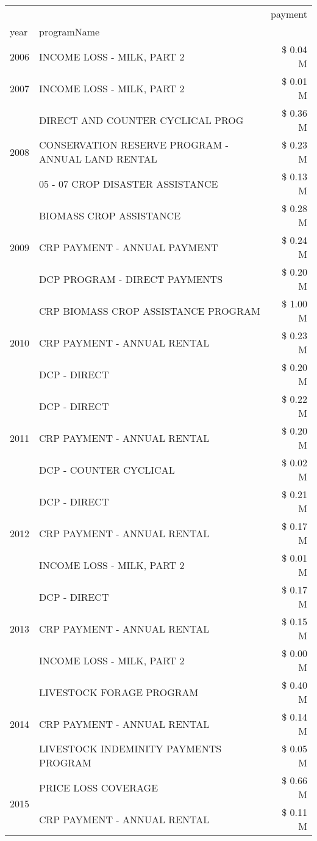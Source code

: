 \begin{tabular}{llr}
\toprule
 &  & payment \\
year & programName &  \\
\midrule
2006 & INCOME LOSS - MILK, PART 2 & \$ 0.04 M \\
\cline{1-3}
2007 & INCOME LOSS - MILK, PART 2 & \$ 0.01 M \\
\cline{1-3}
\multirow[t]{3}{*}{2008} & DIRECT AND COUNTER CYCLICAL PROG & \$ 0.36 M \\
 & CONSERVATION RESERVE PROGRAM - ANNUAL LAND RENTAL & \$ 0.23 M \\
 & 05 - 07 CROP DISASTER ASSISTANCE & \$ 0.13 M \\
\cline{1-3}
\multirow[t]{3}{*}{2009} & BIOMASS CROP ASSISTANCE & \$ 0.28 M \\
 & CRP PAYMENT - ANNUAL PAYMENT & \$ 0.24 M \\
 & DCP PROGRAM - DIRECT PAYMENTS & \$ 0.20 M \\
\cline{1-3}
\multirow[t]{3}{*}{2010} & CRP BIOMASS CROP ASSISTANCE PROGRAM & \$ 1.00 M \\
 & CRP PAYMENT - ANNUAL RENTAL & \$ 0.23 M \\
 & DCP - DIRECT & \$ 0.20 M \\
\cline{1-3}
\multirow[t]{3}{*}{2011} & DCP - DIRECT & \$ 0.22 M \\
 & CRP PAYMENT - ANNUAL RENTAL & \$ 0.20 M \\
 & DCP - COUNTER CYCLICAL & \$ 0.02 M \\
\cline{1-3}
\multirow[t]{3}{*}{2012} & DCP - DIRECT & \$ 0.21 M \\
 & CRP PAYMENT - ANNUAL RENTAL & \$ 0.17 M \\
 & INCOME LOSS - MILK, PART 2 & \$ 0.01 M \\
\cline{1-3}
\multirow[t]{3}{*}{2013} & DCP - DIRECT & \$ 0.17 M \\
 & CRP PAYMENT - ANNUAL RENTAL & \$ 0.15 M \\
 & INCOME LOSS - MILK, PART 2 & \$ 0.00 M \\
\cline{1-3}
\multirow[t]{3}{*}{2014} & LIVESTOCK FORAGE PROGRAM & \$ 0.40 M \\
 & CRP PAYMENT - ANNUAL RENTAL & \$ 0.14 M \\
 & LIVESTOCK INDEMINITY PAYMENTS PROGRAM & \$ 0.05 M \\
\cline{1-3}
\multirow[t]{3}{*}{2015} & PRICE LOSS COVERAGE & \$ 0.66 M \\
 & CRP PAYMENT - ANNUAL RENTAL & \$ 0.11 M \\

\end{tabular}
